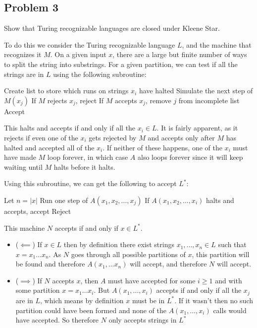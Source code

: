 \documentclass[english]{article}
\begin{document}
\subsection*{Problem 3}
Show that Turing recognizable languages are closed under Kleene Star.

To do this we consider the Turing recognizable language $L$, and the machine
that recognizes it $M$.
On a given input $x$, there are a large but finite number of ways to split the
string into substrings. For a given partition, we can test if all the strings
are in $L$ using the following subroutine:
\begin{algorithmic}
\State Create list to store which runs on strings $x_i$ have halted
		\State Simulate the next step of $M(x_j)$
			\State If $M$ rejects $x_j$, reject
			\State If $M$ accepts $x_j$, remove $j$ from incomplete list
		\EndIf
	\EndFor
		\State Accept
	\EndIf
\EndFor
\EndFunction 
\end{algorithmic}

This halts and accepts if and only if all the $x_i \in L$. It is fairly apparent,
as it rejects if even one of the $x_i$ gets rejected by $M$ and accepts only after
$M$ has halted and accepted all of the $x_i$. If neither of these happens,
one of the $x_i$ must have made $M$ loop forever, in which case $A$ also loops
forever since it will keep waiting until $M$ halts before it halts.

Using this subroutine, we can get the following to accept $L^*$:
\begin{algorithmic}
\State Let $n = |x|$
			\State Run one step of $A(x_1,x_2,\ldots,x_j)$
			\State If $A(x_1,x_2,\ldots,x_i)$ halts and accepts, accept
		\EndFor
	\EndFor
\EndFor
\State Reject
\EndFunction 
\end{algorithmic}

This machine $N$ accepts if and only if $x \in L^*$. 
\begin{itemize}
\item ($ \impliedby $) If $x \in L$ then by definition there exist strings
	$x_1, \ldots, x_n \in L$ such that $x = x_1 \ldots x_n$. As $N$
	goes through all possible partitions of $x$, this partition will be
	found and therefore $A(x_1,\ldots x_n)$ will accept, and therefore
	$N$ will accept.
\item ($ \implies $) If $N$ accepts $x$, then $A$ must have accepted
	for some $i \ge 1$ and with some partition $x = x_1 \ldots x_i$.
	But $A(x_1, \ldots, x_i)$ accepts if and only if all the $x_j$ are
	in $L$, which means by definition $x$ must be in $L^*$. If it wasn't
	then no such partition could have been formed and none of the 
	$A(x_1,\ldots,x_i)$ calls would have accepted. So therefore $N$ only
	accepts strings in $L^*$
\end{itemize}
\end{document}
